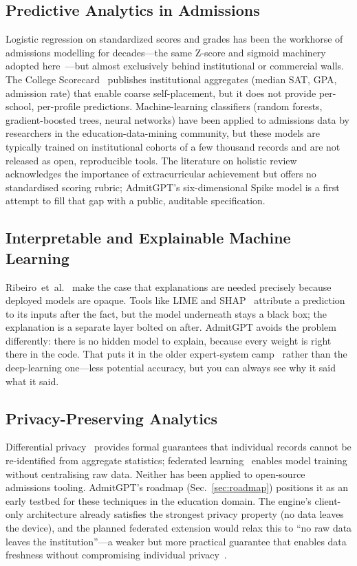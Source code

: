 \documentclass[conference]{IEEEtran}
\begin{document}
\subsection{Predictive Analytics in Admissions}
Logistic regression on standardized scores and grades has been the workhorse of admissions modelling for decades---the same Z-score and sigmoid machinery adopted here~\cite{esl,bishop}---but almost exclusively behind institutional or commercial walls. The College Scorecard~\cite{scorecard} publishes institutional aggregates (median SAT, GPA, admission rate) that enable coarse self-placement, but it does not provide per-school, per-profile predictions. Machine-learning classifiers (random forests, gradient-boosted trees, neural networks) have been applied to admissions data by researchers in the education-data-mining community, but these models are typically trained on institutional cohorts of a few thousand records and are not released as open, reproducible tools. The literature on holistic review~\cite{esl} acknowledges the importance of extracurricular achievement but offers no standardised scoring rubric; AdmitGPT's six-dimensional Spike model is a first attempt to fill that gap with a public, auditable specification.

\subsection{Interpretable and Explainable Machine Learning}
Ribeiro~et~al.~\cite{ribeiro} make the case that explanations are needed precisely because deployed models are opaque. Tools like LIME and SHAP~\cite{ribeiro} attribute a prediction to its inputs after the fact, but the model underneath stays a black box; the explanation is a separate layer bolted on after. AdmitGPT avoids the problem differently: there is no hidden model to explain, because every weight is right there in the code. That puts it in the older expert-system camp~\cite{bishop} rather than the deep-learning one---less potential accuracy, but you can always see why it said what it said.

\subsection{Privacy-Preserving Analytics}
Differential privacy~\cite{dwork} provides formal guarantees that individual records cannot be re-identified from aggregate statistics; federated learning~\cite{mcmahan} enables model training without centralising raw data. Neither has been applied to open-source admissions tooling. AdmitGPT's roadmap (Sec.~\ref{sec:roadmap}) positions it as an early testbed for these techniques in the education domain. The engine's client-only architecture already satisfies the strongest privacy property (no data leaves the device), and the planned federated extension would relax this to ``no raw data leaves the institution''---a weaker but more practical guarantee that enables data freshness without compromising individual privacy~\cite{narayanan}.
\end{document}
